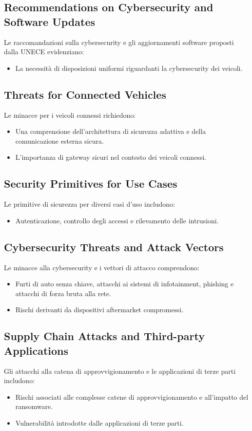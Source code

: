 \subsection{Recommendations on Cybersecurity and Software Updates}
Le raccomandazioni sulla cybersecurity e gli aggiornamenti software proposti dalla UNECE
evidenziano:
\begin{itemize} 
  \item La necessità di disposizioni uniformi riguardanti la cybersecurity dei veicoli. 
\end{itemize}

\subsection{Threats for Connected Vehicles}
Le minacce per i veicoli connessi richiedono:
\begin{itemize} 
  \item Una comprensione dell'architettura di sicurezza adattiva e della comunicazione
    esterna sicura. 
  \item L'importanza di gateway sicuri nel contesto dei veicoli connessi. 
\end{itemize}

\subsection{Security Primitives for Use Cases}
Le primitive di sicurezza per diversi casi d'uso includono: 
\begin{itemize} 
  \item Autenticazione, controllo degli accessi e rilevamento delle intrusioni. 
\end{itemize}

\subsection{Cybersecurity Threats and Attack Vectors}
Le minacce alla cybersecurity e i vettori di attacco comprendono: 
\begin{itemize} 
  \item Furti di auto senza chiave, attacchi ai sistemi di infotainment, phishing e
    attacchi di forza bruta alla rete. 
  \item Rischi derivanti da dispositivi aftermarket compromessi. 
\end{itemize}

\subsection{Supply Chain Attacks and Third-party Applications}
Gli attacchi alla catena di approvvigionamento e le applicazioni di terze parti includono: 
\begin{itemize}
  \item Rischi associati alle complesse catene di approvvigionamento e all'impatto del
    ransomware. 
  \item Vulnerabilità introdotte dalle applicazioni di terze parti.
\end{itemize}

